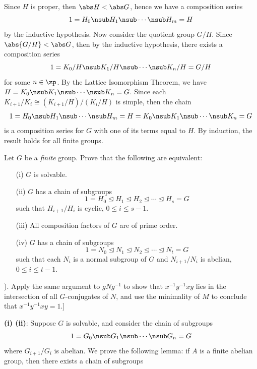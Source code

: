 \begin{problems}
\begin{sol}
        Since $H$ is proper, then $\abs H < \abs G$, hence we have a composition series
        \[1 = H_0 \nsub H_1 \nsub \cdots \nsub H_m = H\]
        by the inductive hypothesis. Now consider the quotient group $G/H$. Since $\abs{G/H} < \abs G$, then by the inductive hypothesis, there exists a composition series
        \[1 = K_0/H \nsub K_1/H \nsub \cdots \nsub K_n/H = G/H\]
        for some $n \in \zp$. By the Lattice Isomorphism Theorem, we have $H = K_0 \nsub K_1 \nsub \cdots \nsub K_n = G$. Since each $K_{i + 1}/K_i \cong (K_{i + 1}/H)/(K_i/H)$ is simple, then the chain
        \[1 = H_0 \nsub H_1 \nsub \cdots \nsub H_m = H = K_0 \nsub K_1 \nsub \cdots \nsub K_n = G\]
        is a composition series for $G$ with one of its terms equal to $H$. By induction, the result holds for all finite groups.
    \end{sol}
    \item Let $G$ be a \textit{finite} group. Prove that the following are equivalent:
    \begin{enumerate}
    \item[(i)] $G$ is solvable.
    \item[(ii)] $G$ has a chain of subgroups
    \[1 = H_0 \trianglelefteq H_1 \trianglelefteq H_2 \trianglelefteq \cdots \trianglelefteq H_s = G\]
    such that $H_{i+1}/H_i$ is cyclic, $0 \le i \le s-1$.
    \item[(iii)] All composition factors of $G$ are of prime order.
    \item[(iv)] $G$ has a chain of subgroups
    \[1 = N_0 \trianglelefteq N_1 \trianglelefteq N_2 \trianglelefteq \cdots \trianglelefteq N_t = G\]
    such that each $N_i$ is a normal subgroup of $G$ and $N_{i+1}/N_i$ is abelian, $0 \le i \le t-1$.
    \end{enumerate}
    \noindent [For (iv), prove that a minimal nontrivial normal subgroup $M$ of $G$ is necessarily abelian and then use induction. To see that $M$ is abelian, let $N \trianglelefteq M$ be of prime index (by (iii)) and show that $x^{-1}y^{-1}xy \in N$ for all $x,y \in M$ (cf. \hyperref[ex3.1.40]{Exercise 3.1.40}). Apply the same argument to $gNg^{-1}$ to show that $x^{-1}y^{-1}xy$ lies in the intersection of all $G$-conjugates of $N$, and use the minimality of $M$ to conclude that $x^{-1}y^{-1}xy = 1$.]
    \begin{sol}
        \textbf{(i) \rightimp (ii)}: Suppose $G$ is solvable, and consider the chain of subgroups
        \[1 = G_0 \nsub G_1 \nsub \cdots \nsub G_n = G\]
        where $G_{i + 1}/G_i$ is abelian. We prove the following lemma: if $A$ is a finite abelian group, then there exists a chain of subgroups

\end{sol}
\end{problems}
